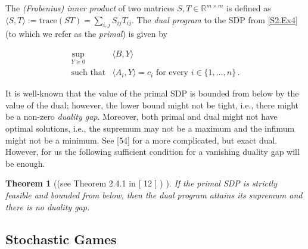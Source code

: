 \documentclass[10pt,a4paper]{article}
\newtheorem{theorem}{Theorem}
\theoremstyle{definition}
\begin{document}
The \emph{(Frobenius) inner product} of two matrices $S,T\in{\mathbb{R}}^{m\times m}$ is defined as $\langle S,T\rangle:=\text{trace}(ST)=\sum_{i,j}S_{ij}T_{ij}$. The \emph{dual program} to the SDP from \eqref{S2.Ex4} (to which we refer as the \emph{primal}) is given by


\begin{equation}\tag{D}\label{S2.Ex6}
\begin{aligned}
\displaystyle\sup_{Y\succeq 0} & \displaystyle\langle B,Y\rangle \\
\text{such that} & \displaystyle\langle A_{i},Y\rangle=c_{i}\text{ for every }i\in\{1,\dots,n\}\,.
\end{aligned}
\end{equation}

It is well-known that the value of the primal SDP is bounded from below by the value of the dual; however, the lower bound might not be tight, i.e., there might be a non-zero \emph{duality gap}. Moreover, both primal and dual might not have optimal solutions, i.e., the supremum may not be a maximum and the infimum might not be a minimum. See [54] for a more complicated, but exact dual. However, for us the following sufficient condition for a vanishing duality gap will be enough.

\setcounter{theorem}{1}
\begin{theorem}[{(see Theorem 2.4.1 in [ 12 ] ) }]\label{Thmtheorem2}
If the primal SDP is strictly feasible and bounded from below, then the dual program attains its supremum and there is no duality gap.

\end{theorem}

\subsection*{Stochastic Games}
\end{document}
